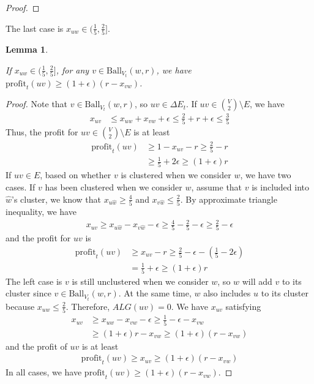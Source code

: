 \documentclass[11pt]{article}
\newtheorem{lemma}[theorem]{Lemma}
\newcommand{\ball}{\mathrm{Ball}}
\newcommand{\profit}{\mathrm{profit}}
\newcommand{\onefive}{\frac{1}{5}}
\newcommand{\twofive}{\frac{2}{5}}
\newcommand{\threefive}{\frac{3}{5}}
\newcommand{\fourfive}{\frac{4}{5}}
\begin{document}
\begin{CJK*}{UTF8}{gbsn}
\begin{proof}
\end{proof}

The last case is $x_{uw} \in (\onefive, \twofive]$.
\begin{lemma}
\label{lem:fourthcaseprofit}



If $x_{uw} \in (\onefive, \twofive]$, for any $v \in \ball_{V_t}(w, r)$, we have $\profit_{t}(uv) \geq (1 + \epsilon)(r - x_{vw})$.
\end{lemma}
\begin{proof}
Note that $v \in \ball_{V_t}(w, r)$, so $uv \in \Delta E_t$. If $uv \in {V \choose 2} \setminus E$, we have 
\begin{align*}
    x_{uv} &\leq x_{uw} + x_{vw} + \epsilon \leq \twofive + r + \epsilon \leq \threefive
\end{align*}
Thus, the profit for $uv \in {V \choose 2} \setminus E$ is at least 
\begin{align*}
    \profit_t(uv) &\geq 1 - x_{uv} - r \geq \twofive - r \\
    &\geq \onefive + 2\epsilon \geq (1 + \epsilon)r 
\end{align*}
If $uv \in E$, based on whether $v$ is clustered when we consider $w$, we have two cases. If $v$ has been clustered when we consider $w$, assume that $v$ is included into $\hat{w}$'s cluster, we know that $x_{u\hat{w}} \geq \fourfive$ and $x_{v\hat{w}} \leq \twofive$. By approximate triangle inequality, we have  
\begin{align*}
    x_{uv} \geq x_{u\hat{w}} - x_{v\hat{w}} - \epsilon \geq \fourfive - \twofive - \epsilon \geq \twofive - \epsilon
\end{align*}
and the profit for $uv$ is 
\begin{align*}
    \profit_t(uv) &\geq x_{uv} - r \geq \twofive - \epsilon - (\onefive - 2\epsilon) \\
    &= \onefive + \epsilon \geq (1 + \epsilon)r
\end{align*}
The left case is $v$ is still unclustered when we consider $w$, so $w$ will add $v$ to its cluster since $v \in \ball_{V_t}(w, r)$. At the same time, $w$ also includes $u$ to its cluster because $x_{uw} \leq \twofive$. Therefore, $ALG(uv) = 0$. We have $x_{uv}$ satisfying
\begin{align*}
    x_{uv} &\geq x_{uw} - x_{vw} - \epsilon \geq \onefive - \epsilon - x_{vw} \\
    &\geq (1 + \epsilon)r - x_{vw} \geq (1 + \epsilon)(r - x_{vw})
\end{align*}
and the profit of $uv$ is at least 
\begin{align*}
    \profit_t(uv) \geq x_{uv} \geq (1 + \epsilon)(r - x_{vw})
\end{align*}
In all cases, we have $\profit_t(uv) \geq (1 + \epsilon)(r - x_{vw})$.
\end{proof}


\end{CJK*}
\end{document}
